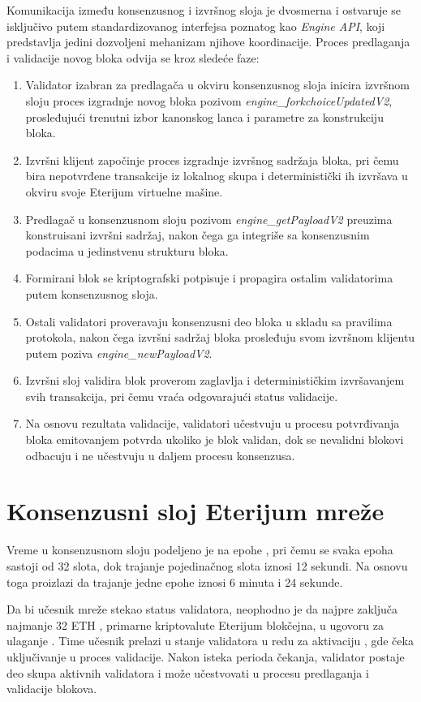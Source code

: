 Komunikacija između konsenzusnog i izvršnog sloja je dvosmerna i ostvaruje se isključivo putem standardizovanog interfejsa poznatog kao \textit{Engine API}, koji predstavlja jedini dozvoljeni mehanizam njihove koordinacije. Proces predlaganja i validacije novog bloka odvija se kroz sledeće faze:
\begin{enumerate}
\item Validator izabran za predlagača u okviru konsenzusnog sloja inicira izvršnom sloju proces izgradnje novog bloka pozivom \textit{engine\_forkchoiceUpdatedV2}, prosleđujući trenutni izbor kanonskog lanca i parametre za konstrukciju bloka.
\item Izvršni klijent započinje proces izgradnje izvršnog sadržaja bloka, pri čemu bira nepotvrđene transakcije iz lokalnog skupa i deterministički ih izvršava u okviru svoje Eterijum virtuelne mašine.
\item Predlagač u konsenzusnom sloju pozivom \textit{engine\_getPayloadV2} preuzima konstruisani izvršni sadržaj, nakon čega ga integriše sa konsenzusnim podacima u jedinstvenu strukturu bloka.
\item Formirani blok se kriptografski potpisuje i propagira ostalim validatorima putem konsenzusnog sloja.
\item Ostali validatori proveravaju konsenzusni deo bloka u skladu sa pravilima protokola, nakon čega izvršni sadržaj bloka prosleđuju svom izvršnom klijentu putem poziva \textit{engine\_newPayloadV2}.
\item Izvršni sloj validira blok proverom zaglavlja i determinističkim izvršavanjem svih transakcija, pri čemu vraća odgovarajući status validacije.
\item Na osnovu rezultata validacije, validatori učestvuju u procesu potvrđivanja bloka emitovanjem potvrda ukoliko je blok validan, dok se nevalidni blokovi odbacuju i ne učestvuju u daljem procesu konsenzusa.
\end{enumerate}

\section{Konsenzusni sloj Eterijum mreže}
Vreme u konsenzusnom sloju podeljeno je na epohe , pri čemu se svaka epoha sastoji od 32 slota, dok trajanje pojedinačnog slota iznosi 12 sekundi. Na osnovu toga proizlazi da trajanje jedne epohe iznosi 6 minuta i 24 sekunde.

Da bi učesnik mreže stekao status validatora, neophodno je da najpre zaključa najmanje 32 ETH \cite{VALIDATOReip7251}, primarne kriptovalute Eterijum blokčejna, u ugovoru za ulaganje . Time učesnik prelazi u stanje validatora u redu za aktivaciju , gde čeka uključivanje u proces validacije. Nakon isteka perioda čekanja, validator postaje deo skupa aktivnih validatora i može učestvovati u procesu predlaganja i validacije blokova.

